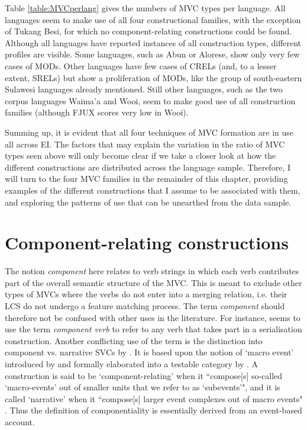 Table \ref{table:MVCperlang} gives the numbers of MVC types per language. All languages seem to make use of all four constructional families, with the exception of Tukang Besi, for which no component-relating constructions could be found. Although all languages have reported instances of all construction types, different profiles are visible. Some languages, such as Abun or Alorese, show only very few cases of MODs. Other languages have few cases of CRELs (and, to a lesser extent, SRELs) but show a proliferation of MODs, like the group of south-eastern Sulawesi languages already mentioned. Still other languages, such as the two corpus languages Waima'a and Wooi, seem to make good use of all construction families (although FJUX scores very low in Wooi). 

Summing up, it is evident that all four techniques of MVC formation are in use all across EI. The factors that may explain the variation in the ratio of MVC types seen above will only become clear if we take a closer look at how the different constructions are distributed across the language sample. Therefore, I will turn to the four MVC families in the remainder of this chapter, providing examples of the different constructions that I assume to be associated with them, and exploring the patterns of use that can be unearthed from the data sample.

\section{Component-relating constructions}\label{sec:crel}

The notion \textit{component} here relates to verb strings in which each verb contributes part of the overall semantic structure of the MVC. This is meant to exclude other types of MVCs where the verbs do not enter into a merging relation, i.e. their LCS do not undergo a feature matching process. The term \textit{component} should therefore not be confused with other uses in the literature. For instance, \citet{dixon2006serial} seems to use the term \textit{component verb} to refer to any verb that takes part in a serialisation construction. Another conflicting use of the term is the distinction into component vs. narrative SVCs by \citet{vanstaden2008serial}. It is based upon the notion of `macro event' introduced by \citet{talmy2000toward} and formally elaborated into a testable category by \citet{bohnemeyer2007principles, bohnemeyer2011}. A construction is said to be `component-relating' when it ``compose[s] so-called `macro-events’
out of smaller units that we refer to as `subevents’", and it is called `narrative' when it ``compose[s] larger event complexes out of macro events" \citep[28]{vanstaden2008serial}. Thus the definition of componentiality is essentially derived from an event-based account. 

